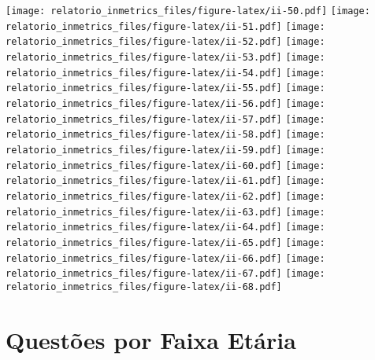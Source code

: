 \documentclass[]{book}
\begin{document}
\texttt{[image: relatorio\_inmetrics\_files/figure-latex/ii-50.pdf]} \texttt{[image: relatorio\_inmetrics\_files/figure-latex/ii-51.pdf]} \texttt{[image: relatorio\_inmetrics\_files/figure-latex/ii-52.pdf]} \texttt{[image: relatorio\_inmetrics\_files/figure-latex/ii-53.pdf]} \texttt{[image: relatorio\_inmetrics\_files/figure-latex/ii-54.pdf]} \texttt{[image: relatorio\_inmetrics\_files/figure-latex/ii-55.pdf]} \texttt{[image: relatorio\_inmetrics\_files/figure-latex/ii-56.pdf]} \texttt{[image: relatorio\_inmetrics\_files/figure-latex/ii-57.pdf]} \texttt{[image: relatorio\_inmetrics\_files/figure-latex/ii-58.pdf]} \texttt{[image: relatorio\_inmetrics\_files/figure-latex/ii-59.pdf]} \texttt{[image: relatorio\_inmetrics\_files/figure-latex/ii-60.pdf]} \texttt{[image: relatorio\_inmetrics\_files/figure-latex/ii-61.pdf]} \texttt{[image: relatorio\_inmetrics\_files/figure-latex/ii-62.pdf]} \texttt{[image: relatorio\_inmetrics\_files/figure-latex/ii-63.pdf]} \texttt{[image: relatorio\_inmetrics\_files/figure-latex/ii-64.pdf]} \texttt{[image: relatorio\_inmetrics\_files/figure-latex/ii-65.pdf]} \texttt{[image: relatorio\_inmetrics\_files/figure-latex/ii-66.pdf]} \texttt{[image: relatorio\_inmetrics\_files/figure-latex/ii-67.pdf]} \texttt{[image: relatorio\_inmetrics\_files/figure-latex/ii-68.pdf]}

\hypertarget{questoes-por-faixa-etaria}{%
\section{Questões por Faixa Etária}\label{questoes-por-faixa-etaria}}
\end{document}
